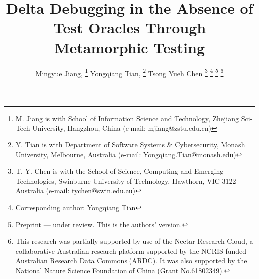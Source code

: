 \documentclass[journal]{IEEEtran}
\begin{document}
\title{Delta Debugging in the Absence of Test Oracles Through Metamorphic Testing}

\author{Mingyue Jiang, \thanks{M. Jiang is with School of Information Science and Technology, Zhejiang Sci-Tech University, Hangzhou,
China (e-mail: mjiang@zstu.edu.cn)}
Yongqiang Tian, \thanks{Y. Tian is with Department of Software Systems \& Cybersecurity, Monash University, Melbourne,
Australia (e-mail: Yongqiang.Tian@monash.edu)} %
Tsong Yueh Chen 
\thanks{T. Y. Chen is with the School of Science, Computing and Emerging
Technologies, Swinburne University of Technology, Hawthorn, VIC 3122
Australia (e-mail: tychen@swin.edu.au)}
\thanks{Corresponding author: Yongqiang Tian}
\thanks{Preprint --- under review. This is the authors' version.}
\thanks{This research was partially supported by use of the Nectar Research Cloud, a collaborative Australian research platform supported by the NCRIS-funded Australian Research Data Commons (ARDC).
It was also supported by the National Nature Science Foundation of China (Grant
No.61802349).
}
}















\maketitle
\end{document}
